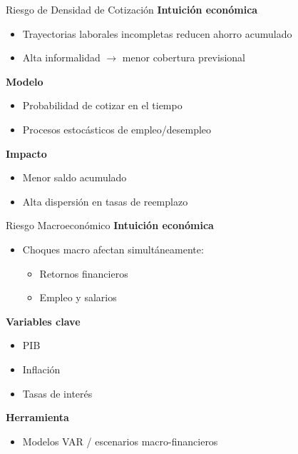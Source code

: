 \documentclass{beamer}
\begin{document}
\begin{frame}{Riesgo de Densidad de Cotización}
\textbf{Intuición económica}
\begin{itemize}
\item Trayectorias laborales incompletas reducen ahorro acumulado
\item Alta informalidad $\rightarrow$ menor cobertura previsional
\end{itemize}

\vspace{0.3cm}
\textbf{Modelo}
\begin{itemize}
\item Probabilidad de cotizar en el tiempo
\item Procesos estocásticos de empleo/desempleo
\end{itemize}

\vspace{0.3cm}
\textbf{Impacto}
\begin{itemize}
\item Menor saldo acumulado
\item Alta dispersión en tasas de reemplazo
\end{itemize}
\end{frame}

\begin{frame}{Riesgo Macroeconómico}
\textbf{Intuición económica}
\begin{itemize}
\item Choques macro afectan simultáneamente:
\begin{itemize}
\item Retornos financieros
\item Empleo y salarios
\end{itemize}
\end{itemize}

\vspace{0.3cm}
\textbf{Variables clave}
\begin{itemize}
\item PIB
\item Inflación
\item Tasas de interés
\end{itemize}

\vspace{0.3cm}
\textbf{Herramienta}
\begin{itemize}
\item Modelos VAR / escenarios macro-financieros
\end{itemize}
\end{frame}
\end{document}
